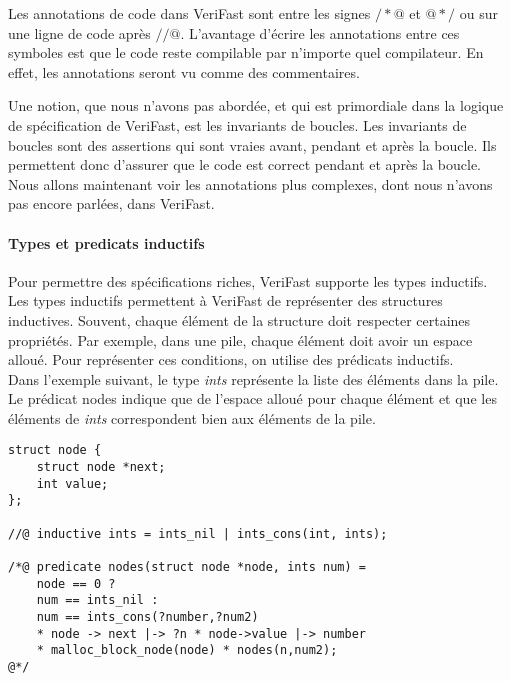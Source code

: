 \documentclass[11pt,openany]{article}
\newcommand{\verifast}{VeriFast}
\begin{document}
		Les annotations de code dans \verifast{} sont entre les signes $/*@$ et $@*/$ ou sur une ligne de code apr\`es $//@$. L'avantage d'\'ecrire les annotations entre ces symboles est que le code reste compilable par n'importe quel compilateur. En effet, les annotations seront vu comme des commentaires.
		
		Une notion, que nous n'avons pas abord\'ee, et qui est primordiale dans la logique de sp\'ecification de \verifast, est les invariants de boucles. Les invariants de boucles sont des assertions qui sont vraies avant, pendant et apr\`es la boucle. Ils permettent donc d'assurer que le code est correct pendant et apr\`es la boucle. Nous allons maintenant voir les annotations plus complexes, dont nous n'avons pas encore parl\'ees, dans \verifast.
			\paragraph{Types et predicats inductifs}
		
				Pour permettre des sp\'ecifications riches, \verifast{} supporte les types inductifs. Les types inductifs permettent \`a \verifast{} de repr\'esenter des structures inductives. Souvent, chaque \'el\'ement de la structure doit respecter certaines propri\'et\'es. Par exemple, dans une pile, chaque \'el\'ement doit avoir un espace allou\'e.	Pour repr\'esenter ces conditions, on utilise des pr\'edicats inductifs.\\ Dans l'exemple suivant, le type \textit{ints} repr\'esente la liste des \'el\'ements dans la pile. Le pr\'edicat nodes indique que de l'espace allou\'e pour chaque \'el\'ement et que les \'el\'ements de \textit{ints} correspondent bien aux \'el\'ements de la pile.
				
			
			\begin{lstlisting}
struct node {
	struct node *next;
	int value;
};
				
//@ inductive ints = ints_nil | ints_cons(int, ints);

/*@ predicate nodes(struct node *node, ints num) =
	node == 0 ?
	num == ints_nil :
	num == ints_cons(?number,?num2) 
	* node -> next |-> ?n * node->value |-> number
	* malloc_block_node(node) * nodes(n,num2);
@*/
	
			\end{lstlisting}			
\end{document}
